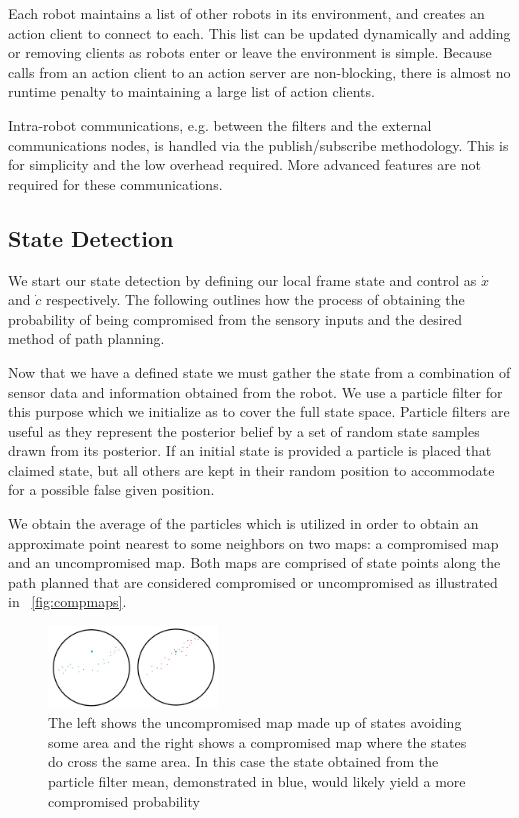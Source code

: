 \documentclass[conference]{IEEEtran}
\begin{document}
Each robot maintains a list of other robots in its environment, and creates an action client to connect to each. This list can be updated dynamically and adding or removing clients as robots enter or leave the environment is simple. Because calls from an action client to an action server are non-blocking, there is almost no runtime penalty to maintaining a large list of action clients.

Intra-robot communications, e.g. between the filters and the external communications nodes, is handled via the publish/subscribe methodology. This is for simplicity and the low overhead required. More advanced features are not required for these communications.

\subsection{State Detection}

We start our state detection by defining our local frame state and control as $\dot{x}$ and $\dot{c}$ respectively. The following outlines how the process of obtaining the probability of being compromised from the sensory inputs and the desired method of path planning.

Now that we have a defined state we must gather the state from a combination of sensor data and information obtained from the robot. We use a particle filter for this purpose which we initialize as to cover the full state space. Particle filters are useful as they represent the posterior belief by a set of random state samples drawn from its posterior\cite{Thrun2002Probabilistic}. If an initial state is provided a particle is placed that claimed state, but all others are kept in their random position to accommodate for a possible false given position.
	
We obtain the average of the particles  which is utilized in order to obtain an approximate point nearest to some neighbors on two maps: a compromised map and an uncompromised map. Both maps are comprised of state points along the path planned that are considered compromised or uncompromised as illustrated in ~\autoref{fig:compmaps}.
	
\begin{figure}[]
\centering
\includegraphics[width=0.4\textwidth]{Path_comp_uncomp}
\caption{The left shows the uncompromised map made up of states avoiding some area and the right shows a compromised map where the states do cross the same area. In this case the state obtained from the particle filter mean, demonstrated in blue, would likely yield a more compromised probability}
\label{fig:compmaps}
\end{figure}
	
\end{document}
